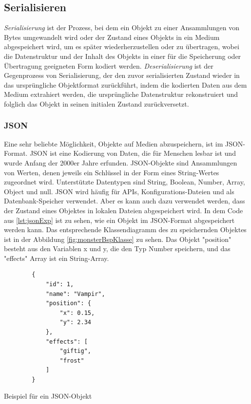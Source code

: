 \subsection{Serialisieren}

\textit{Serialisierung} ist der Prozess, bei dem ein Objekt zu einer Ansammlungen von Bytes umgewandelt wird oder der Zustand eines Objekts in ein Medium abgespeichert wird, um es später wiederherzustellen oder zu übertragen, wobei die Datenstruktur und der Inhalt des Objekts in einer für die Speicherung oder Übertragung geeigneten Form kodiert werden. \textit{Deserialisierung} ist der Gegenprozess von Serialisierung, der den zuvor serialisierten Zustand wieder in das ursprüngliche Objektformat zurückführt, indem die kodierten Daten aus dem Medium extrahiert werden, die ursprüngliche Datenstruktur rekonstruiert und folglich das Objekt in seinen initialen Zustand zurückversetzt.\cite{codeguruWorkingWith}

\subsubsection{JSON}
Eine sehr beliebte Möglichkeit, Objekte auf Medien abzuspeichern, ist im JSON-Format. JSON ist eine Kodierung von Daten, die für Menschen lesbar ist und wurde Anfang der 2000er Jahre erfunden. JSON-Objekte sind Ansammlungen von Werten, denen jeweils ein Schlüssel in der Form eines String-Wertes zugeordnet wird. Unterstützte Datentypen sind String, Boolean, Number, Array, Object und null. JSON wird häufig für APIs, Konfigurations-Dateien und als Datenbank-Speicher verwendet. Aber es kann auch dazu verwendet werden, dass der Zustand eines Objektes in lokalen Dateien abgespeichert wird.\cite{mongodbJSONBSON} 
In dem Code aus \ref{lst:jsonExp} ist zu sehen, wie ein Objekt im JSON-Format abgespeichert werden kann. Das entsprechende Klassendiagramm des zu speichernden Objektes ist in der Abbildung \ref{fig:monsterBspKlasse} zu sehen. Das Objekt "position" besteht aus den Variablen x und y, die den Typ Number speichern, und das "effects" Array ist ein String-Array. 

\begin{listing}[htp]
    \begin{verbatim}
        {
            "id": 1,
            "name": "Vampir",
            "position": {
                "x": 0.15,
                "y": 2.34
            },
            "effects": [
                "giftig", 
                "frost"
            ]
        }
    \end{verbatim}
    \caption{Beispiel für ein JSON-Objekt}
    \label{lst:jsonExp}
\end{listing}

